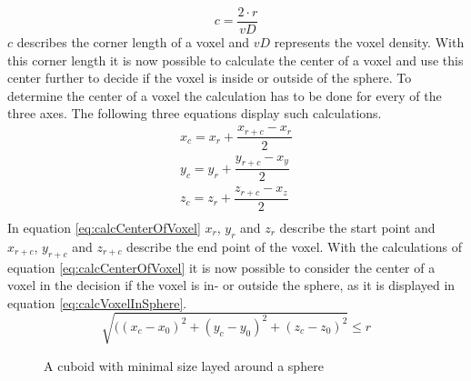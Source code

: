\begin{equation}\label{eq:calcCornerLengthOfVoxel}
c = \dfrac{2 \cdot r}{vD}
\end{equation}
$c$ describes the corner length of a voxel and $vD$ represents the voxel density. With this corner length it is now possible to calculate the center of a voxel and use this center further to decide if the voxel is inside or outside of the sphere. To determine the center of a voxel the calculation has to be done for every of the three axes. The following three equations display such calculations. 
\begin{equation}\label{eq:calcCenterOfVoxel}
\begin{split}
x_{c} = x_{r} + \dfrac{x_{r+c} - x_{r}}{2} \\
y_{c} = y_{r} + \dfrac{y_{r+c} - x_{y}}{2} \\
z_{c} = z_{r} + \dfrac{z_{r+c} - x_{z}}{2} \\
\end{split}
\end{equation}
In equation \ref{eq:calcCenterOfVoxel} $x_{r}$, $y_{r}$ and $z_{r}$ describe the start point and $x_{r+c}$, $y_{r+c}$ and $z_{r+c}$ describe the end point of the voxel.
With the calculations of equation \ref{eq:calcCenterOfVoxel} it is now possible to consider the center of a voxel in the decision if the voxel is in- or outside the sphere, as it is displayed in equation \ref{eq:calcVoxelInSphere}.
\begin{equation}\label{eq:calcVoxelInSphere}
\sqrt{((x_{c} - x_{0})^{2} + (y_{c} - y_{0})^{2} + (z_{c} -z_{0})^{2}} \leq r
\end{equation}



\begin{figure}[ht]
\begin{center}
\caption[A cuboid with minimal size layed around a sphere in two dimensions]{A cuboid with minimal size layed around a sphere}
\label{tikz:CuboidSphere}
\end{center}
\end{figure}


